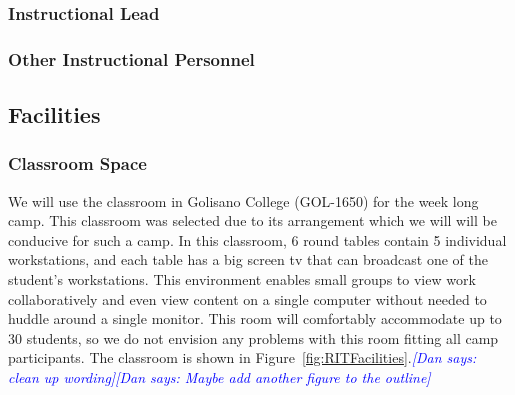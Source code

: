 \documentclass[12pt]{article}
\newcommand{\dan}[1]{\textcolor{blue}{{\it [Dan says: #1]}}}
\begin{document}




\subsubsection{Instructional Lead}


\subsubsection{Other Instructional Personnel}



\subsection{Facilities}

\subsubsection{Classroom Space}
We will use the classroom in Golisano College (GOL-1650) for the week long camp. This classroom was selected due to its arrangement which we will will be conducive for such a camp. In this classroom, 6 round tables contain 5 individual workstations, and each table has a big screen tv that can broadcast one of the student's workstations. This environment enables small groups to view work collaboratively and even view content on a single computer without needed to huddle around a single monitor. This room will comfortably accommodate up to 30 students, so we do not envision any problems with this room fitting all camp participants. The classroom is shown in Figure~\ref{fig:RITFacilities}.\dan{clean up wording}\dan{Maybe add another figure to the outline}
\end{document}

